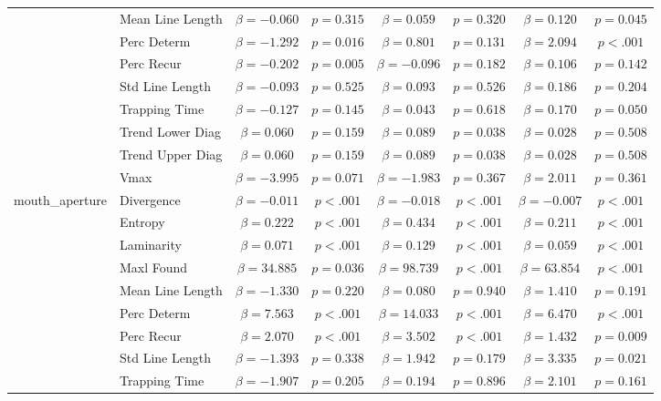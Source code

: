 \begin{tabular}{llcc|cc|cc}
 & Mean Line Length & $\beta = -0.060$ & $p = 0.315$ & $\beta = 0.059$ & $p = 0.320$ & $\beta = 0.120$ & $p = 0.045$ \\
 & Perc Determ & $\beta = -1.292$ & $p = 0.016$ & $\beta = 0.801$ & $p = 0.131$ & $\beta = 2.094$ & $p < .001$ \\
 & Perc Recur & $\beta = -0.202$ & $p = 0.005$ & $\beta = -0.096$ & $p = 0.182$ & $\beta = 0.106$ & $p = 0.142$ \\
 & Std Line Length & $\beta = -0.093$ & $p = 0.525$ & $\beta = 0.093$ & $p = 0.526$ & $\beta = 0.186$ & $p = 0.204$ \\
 & Trapping Time & $\beta = -0.127$ & $p = 0.145$ & $\beta = 0.043$ & $p = 0.618$ & $\beta = 0.170$ & $p = 0.050$ \\
 & Trend Lower Diag & $\beta = 0.060$ & $p = 0.159$ & $\beta = 0.089$ & $p = 0.038$ & $\beta = 0.028$ & $p = 0.508$ \\
 & Trend Upper Diag & $\beta = 0.060$ & $p = 0.159$ & $\beta = 0.089$ & $p = 0.038$ & $\beta = 0.028$ & $p = 0.508$ \\
 & Vmax & $\beta = -3.995$ & $p = 0.071$ & $\beta = -1.983$ & $p = 0.367$ & $\beta = 2.011$ & $p = 0.361$ \\
\midrule
\multirow{12}{*}{mouth_aperture} & Divergence & $\beta = -0.011$ & $p < .001$ & $\beta = -0.018$ & $p < .001$ & $\beta = -0.007$ & $p < .001$ \\
 & Entropy & $\beta = 0.222$ & $p < .001$ & $\beta = 0.434$ & $p < .001$ & $\beta = 0.211$ & $p < .001$ \\
 & Laminarity & $\beta = 0.071$ & $p < .001$ & $\beta = 0.129$ & $p < .001$ & $\beta = 0.059$ & $p < .001$ \\
 & Maxl Found & $\beta = 34.885$ & $p = 0.036$ & $\beta = 98.739$ & $p < .001$ & $\beta = 63.854$ & $p < .001$ \\
 & Mean Line Length & $\beta = -1.330$ & $p = 0.220$ & $\beta = 0.080$ & $p = 0.940$ & $\beta = 1.410$ & $p = 0.191$ \\
 & Perc Determ & $\beta = 7.563$ & $p < .001$ & $\beta = 14.033$ & $p < .001$ & $\beta = 6.470$ & $p < .001$ \\
 & Perc Recur & $\beta = 2.070$ & $p < .001$ & $\beta = 3.502$ & $p < .001$ & $\beta = 1.432$ & $p = 0.009$ \\
 & Std Line Length & $\beta = -1.393$ & $p = 0.338$ & $\beta = 1.942$ & $p = 0.179$ & $\beta = 3.335$ & $p = 0.021$ \\
 & Trapping Time & $\beta = -1.907$ & $p = 0.205$ & $\beta = 0.194$ & $p = 0.896$ & $\beta = 2.101$ & $p = 0.161$ \\

\end{tabular}
